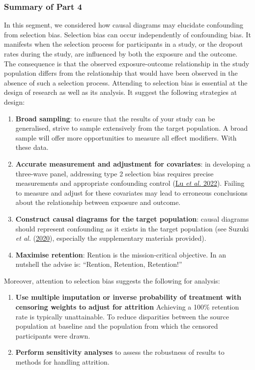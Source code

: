 \documentclass[
  singlecolumn]{article}
\begin{document}
\hypertarget{summary-of-part-4}{%
\subsubsection{Summary of Part 4}\label{summary-of-part-4}}

In this segment, we considered how causal diagrams may elucidate
confounding from selection bias. Selection bias can occur independently
of confounding bias. It manifests when the selection process for
participants in a study, or the dropout rates during the study, are
influenced by both the exposure and the outcome. The consequence is that
the observed exposure-outcome relationship in the study population
differs from the relationship that would have been observed in the
absence of such a selection process. Attending to selection bias is
essential at the design of research as well as its analysis. It suggest
the following strategies at design:

\begin{enumerate}
\def\labelenumi{\arabic{enumi}.}
\item
  \textbf{Broad sampling}: to ensure that the results of your study can
  be generalised, strive to sample extensively from the target
  population. A broad sample will offer more opportunities to measure
  all effect modifiers. With these data.
\item
  \textbf{Accurate measurement and adjustment for covariates}: in
  developing a three-wave panel, addressing type 2 selection bias
  requires precise measurements and appropriate confounding control
  (\protect\hyperlink{ref-lu2022}{Lu \emph{et al.} 2022}). Failing to
  measure and adjust for these covariates may lead to erroneous
  conclusions about the relationship between exposure and outcome.
\item
  \textbf{Construct causal diagrams for the target population}: causal
  diagrams should represent confounding as it exists in the target
  population (see Suzuki \emph{et al.}
  (\protect\hyperlink{ref-suzuki2020}{2020}), especially the
  supplementary materials provided).
\item
  \textbf{Maximise retention}: Rention is the mission-critical
  objective. In an nutshell the advise is: ``Rention, Retention,
  Retention!''
\end{enumerate}

Moreover, attention to selection bias suggests the following for
analysis:

\begin{enumerate}
\def\labelenumi{\arabic{enumi}.}
\setcounter{enumi}{4}
\item
  \textbf{Use multiple imputation or inverse probability of treatment
  with censoring weights to adjust for attrition} Achieving a 100\%
  retention rate is typically unattainable. To reduce disparities
  between the source population at baseline and the population from
  which the censored participants were drawn.
\item
  \textbf{Perform sensitivity analyses} to assess the robustness of
  results to methods for handling attrition.
\end{enumerate}
\end{document}
